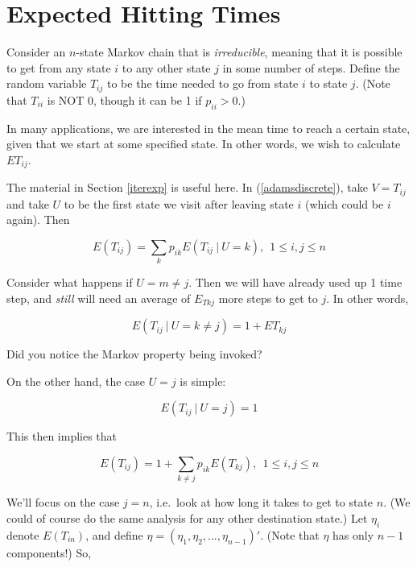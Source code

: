 \section{Expected Hitting Times}

Consider an $n$-state Markov chain that is {\it irreducible},
meaning that it is possible to get from any state $i$ to any other state
$j$ in some number of steps.  Define the random variable $T_{ij}$ to be
the time needed to go from state $i$ to state $j$.  (Note that $T_{ii}$
is NOT 0, though it can be 1 if $p_{ii} > 0$.)

In many applications, we are interested in the mean time to reach a
certain state, given that we start at some specified state.  In other
words, we wish to calculate $ET_{ij}$.

The material in Section \ref{iterexp} is useful here.  In
(\ref{adamsdiscrete}), take $V = T_{ij}$ and take $U$ to be the first
state we visit after leaving state $i$ (which could be $i$ again).  Then

\begin{equation}
\label{etij}
E(T_{ij}) = \sum_{k} p_{ik} E(T_{ij} ~|~ U = k), ~~
1 \leq i,j \leq n
\end{equation}

Consider what happens if $U = m \neq j$.  Then we will have already used
up 1 time step, and {\it still} will need an average of $E_{Tkj}$ more
steps to get to $j$.  In other words,

\begin{equation}
E(T_{ij} ~|~ U = k \neq j) = 1 + ET_{kj}
\end{equation}

Did you notice the Markov property being invoked?

On the other hand, the case $U = j$ is simple:

\begin{equation}
E(T_{ij} ~|~ U = j) = 1 
\end{equation}

This then implies that

\begin{equation}
\label{etij1}
E(T_{ij}) 
= 1 + \sum_{k \neq j} p_{ik} E(T_{kj}), ~~
1 \leq i,j \leq n
\end{equation}

We'll focus on the case $j = n$, i.e.\ look at how long it takes to get
to state $n$.  (We could of course do the same analysis for any other
destination state.)
Let $\eta_{i}$ denote $E(T_{in})$, and define  $\eta =
(\eta_1,\eta_2,...,\eta_{n-1})'$.  (Note that $\eta$ has only $n-1$
components!)  So,

